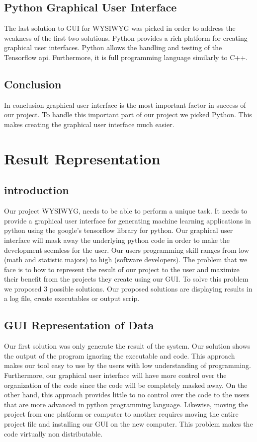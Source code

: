 \documentclass[journal,10pt,onecolumn,compsoc]{IEEEtran} \usepackage[margin=1.0in]{geometry} \usepackage{pdfpages} \usepackage{graphicx}
\begin{document}
\subsection{Python Graphical User Interface}
The last solution to GUI for WYSIWYG was picked in order to address the  weakness of the first two solutions. 
Python provides a rich platform for creating graphical user interfaces. 
Python allows the handling and testing of the Tensorflow api. 
Furthermore, it is full programming language similarly to C++.

\subsection{Conclusion}
In conclusion graphical user interface is the most important factor in success of our project. 
To handle this important part of our project we picked Python. This makes creating the graphical user interface much easier.

\newpage

\section{Result Representation}
\subsection{introduction}
Our project WYSIWYG, needs to be able to perform a unique task. 
It needs to provide a graphical user interface for generating machine learning applications in python using the google’s tensorflow library for python. 
Our graphical user interface will mask away the underlying python code in order to make the development seemless for the user. 
Our users programming skill ranges from low (math and statistic majors) to high (software developers). 
The problem that we face is to how to represent the result of our project to the user and maximize their benefit from the projects they create using our GUI. 
To solve this problem we proposed 3 possible solutions. Our proposed solutions are displaying results in a log file, create executables or output scrip.

\subsection{GUI Representation of Data}
Our first solution was only generate the result of the system. 
Our solution shows the output of the program ignoring the executable and code. 
This approach makes our tool easy to use by the users with low understanding of  programming. 
Furthermore, our graphical user interface will have more control over the organization of the code since the code will be completely masked away. 
On the other hand, this approach provides little to no control over the code to the users that are more advanced in python programming language. 
Likewise, moving the project from one platform or computer to another requires moving the entire project file and installing our GUI on the new computer. 
This problem makes the code virtually non distributable.
\end{document}
